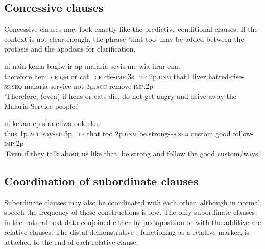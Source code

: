 \subsection{Concessive clauses}

Concessive clauses may look exactly like the predictive conditional clauses. If the context is not clear enough, the phrase  `that too' may be added between the protasis and the apodosis for clarification.  

\ea%
\label{ex:8:x1655}
\gll [Naapeya aara=ki e kasi=ke um-inok=na] ni nain kema bagiw-ir-ap  malaria sevis me wia iirar-eka.\\
therefore hen=\textsc{cf}.\textsc{qm} or cat=\textsc{cf} die-\textsc{imp}.3s=\textsc{tp} 2p.\textsc{unm} that1 liver hatred-rise-\textsc{ss}.\textsc{seq} malaria  service  not 3p.\textsc{acc} remove-\textsc{imp}.2p\\
\glt`Therefore, (even) if hens or cats die, do not get angry and drive away the Malaria Service people.'
\z


\ea%
\label{ex:8:x1430}
\gll [Naap  yia  ma-ikuan=na]      ni  kekan-ep sira  eliwa  ook-eka.\\
thus  1p.\textsc{acc} say-\textsc{fu}.3p=\textsc{tp} that too 2p.\textsc{unm} be.strong-\textsc{ss}.\textsc{seq} custom good follow-\textsc{imp}.2p\\
\glt`Even if they talk about us like that, be strong and follow the good custom/ways.'
\z


\subsection{Coordination of subordinate clauses} 

Subordinate clauses may also be coordinated with each other, although in normal speech the frequency of these constructions is low. The only subordinate clauses in the natural text data conjoined either by juxtaposition or with the additive  are relative clauses. The distal demonstrative , functioning as a relative marker, is attached to the end of each relative clause.

